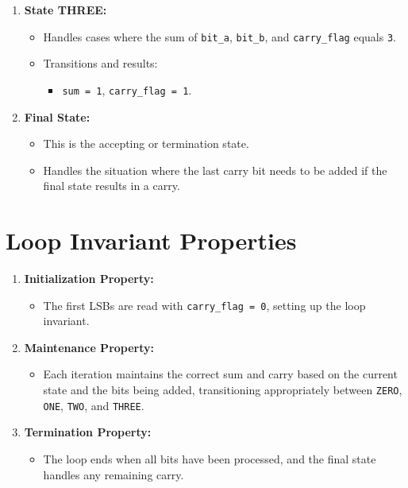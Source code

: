 \documentclass{article}
\begin{document}
\begin{enumerate}[label=\arabic*.]
    \item \textbf{State THREE:}
    \begin{itemize}
        \item Handles cases where the sum of \texttt{bit\_a}, \texttt{bit\_b}, and \texttt{carry\_flag} equals \texttt{3}.
        \item Transitions and results:
        \begin{itemize}
            \item \texttt{sum = 1}, \texttt{carry\_flag = 1}.
        \end{itemize}
    \end{itemize}

    \item \textbf{Final State:}
    \begin{itemize}
        \item This is the accepting or termination state.
        \item Handles the situation where the last carry bit needs to be added if the final state results in a carry.
    \end{itemize}
\end{enumerate}

\section*{Loop Invariant Properties}

\begin{enumerate}[label=\arabic*.]
    \item \textbf{Initialization Property:}
    \begin{itemize}
        \item The first LSBs are read with \texttt{carry\_flag = 0}, setting up the loop invariant.
    \end{itemize}

    \item \textbf{Maintenance Property:}
    \begin{itemize}
        \item Each iteration maintains the correct sum and carry based on the current state and the bits being added, transitioning appropriately between \texttt{ZERO}, \texttt{ONE}, \texttt{TWO}, and \texttt{THREE}.
    \end{itemize}

    \item \textbf{Termination Property:}
    \begin{itemize}
        \item The loop ends when all bits have been processed, and the final state handles any remaining carry.
    \end{itemize}
\end{enumerate}
\end{document}
